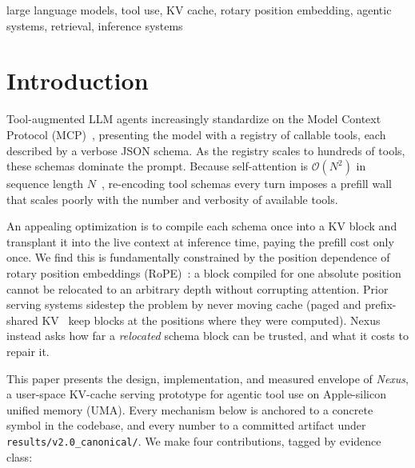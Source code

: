 \documentclass[10pt,conference]{IEEEtran}
\newcommand{\code}[1]{\texttt{\small #1}}
\begin{document}
\begin{IEEEkeywords}
large language models, tool use, KV cache, rotary position embedding, agentic systems,
retrieval, inference systems
\end{IEEEkeywords}

\section{Introduction}
Tool-augmented LLM agents increasingly standardize on the Model Context
Protocol (MCP)~\cite{anthropic2024mcp}, presenting the model with a registry of callable
tools, each described by a verbose JSON schema. As the registry scales to hundreds of
tools, these schemas dominate the prompt. Because self-attention is $\mathcal{O}(N^2)$ in
sequence length $N$~\cite{vaswani2017attention}, re-encoding tool schemas every turn
imposes a prefill wall that scales poorly with the number and verbosity of available tools.

An appealing optimization is to compile each schema once into a KV block and transplant it
into the live context at inference time, paying the prefill cost only once. We find this is
fundamentally constrained by the position dependence of rotary position embeddings
(RoPE)~\cite{su2024roformer}: a block compiled for one absolute position cannot be relocated
to an arbitrary depth without corrupting attention. Prior serving systems sidestep the
problem by never moving cache (paged and prefix-shared KV~\cite{kwon2023vllm,zheng2024sglang}
keep blocks at the positions where they were computed). Nexus instead asks how far a
\emph{relocated} schema block can be trusted, and what it costs to repair it.

This paper presents the design, implementation, and measured envelope of \emph{Nexus}, a
user-space KV-cache serving prototype for agentic tool use on Apple-silicon unified memory
(UMA). Every mechanism below is anchored to a concrete symbol in the codebase, and every
number to a committed artifact under \code{results/v2.0\_canonical/}. We make four
contributions, tagged by evidence class:
\end{document}
